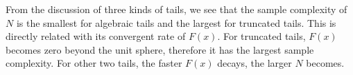 \documentclass[conference,a4paper]{IEEEtran}
\begin{document}
From the discussion of three kinds of tails, we see that the sample complexity of $N$ is the smallest for algebraic tails and the largest
for truncated tails. This is directly related with its convergent rate of $F(x)$.
For truncated tails, $F(x)$ becomes zero beyond the unit sphere, therefore it has the largest sample complexity.
For other two tails, the faster $F(x)$ decays, the larger $N$ becomes.


\end{document}
